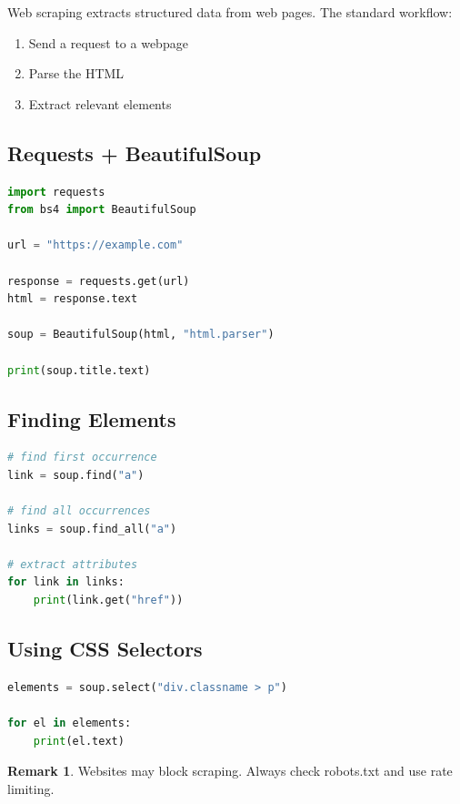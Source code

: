 \documentclass[12pt,oneside]{book}
\numberwithin{equation}{section}
\theoremstyle{definition}
\newtheorem{remark}{Remark}[section]
\theoremstyle{plain}
\theoremstyle{remark}
\begin{document}
Web scraping extracts structured data from web pages. The standard workflow:

\begin{enumerate}
\item Send a request to a webpage
\item Parse the HTML
\item Extract relevant elements
\end{enumerate}

\subsection{Requests + BeautifulSoup}

\begin{lstlisting}[language=Python]
import requests
from bs4 import BeautifulSoup

url = "https://example.com"

response = requests.get(url)
html = response.text

soup = BeautifulSoup(html, "html.parser")

print(soup.title.text)
\end{lstlisting}

\subsection{Finding Elements}

\begin{lstlisting}[language=Python]
# find first occurrence
link = soup.find("a")

# find all occurrences
links = soup.find_all("a")

# extract attributes
for link in links:
    print(link.get("href"))
\end{lstlisting}

\subsection{Using CSS Selectors}

\begin{lstlisting}[language=Python]
elements = soup.select("div.classname > p")

for el in elements:
    print(el.text)
\end{lstlisting}

\begin{remark}
Websites may block scraping. Always check robots.txt and use rate limiting.
\end{remark}
\end{document}
